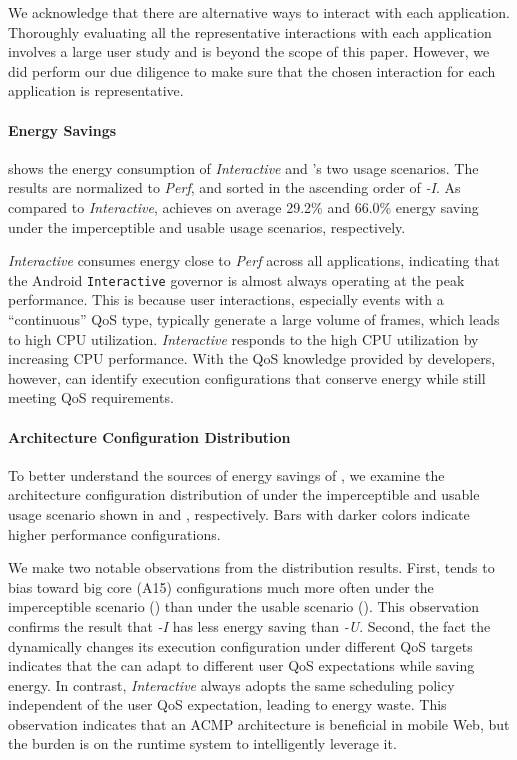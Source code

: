 We acknowledge that there are alternative ways to interact with each application. Thoroughly evaluating all the representative interactions with each application involves a large user study and is beyond the scope of this paper. However, we did perform our due diligence to make sure that the chosen interaction for each application is representative.

\paragraph{Energy Savings}  shows the energy consumption of \textit{Interactive} and \ebs's two usage scenarios. The results are normalized to \textit{Perf}, and sorted in the ascending order of \textit{\ebs-I}. As compared to \textit{Interactive}, \ebs achieves on average 29.2\% and 66.0\% energy saving under the imperceptible and usable usage scenarios, respectively.

\textit{Interactive} consumes energy close to \textit{Perf} across all applications, indicating that the Android \texttt{Interactive} governor is almost always operating at the peak performance. This is because user interactions, especially events with a ``continuous'' QoS type, typically generate a large volume of frames, which leads to high CPU utilization. \textit{Interactive} responds to the high CPU utilization by increasing CPU performance. With the QoS knowledge provided by developers, however, \ebs can identify execution configurations that conserve energy while still meeting QoS requirements.

\paragraph{Architecture Configuration Distribution} To better understand the sources of energy savings of \ebs , we examine the architecture configuration distribution of \ebs under the imperceptible and usable usage scenario shown in  and , respectively. Bars with darker colors indicate higher performance configurations.

We make two notable observations from the distribution results. First, \ebs tends to bias toward big core (A15) configurations much more often under the imperceptible scenario () than under the usable scenario (). This observation confirms the result that \textit{\ebs-I} has less energy saving than \textit{\ebs-U}. Second, the fact the \ebs dynamically changes its execution configuration under different QoS targets indicates that the \ebs can adapt to different user QoS expectations while saving energy. In contrast, \textit{Interactive} always adopts the same scheduling policy independent of the user QoS expectation, leading to energy waste. This observation indicates that an ACMP architecture is beneficial in mobile Web, but the burden is on the runtime system to intelligently leverage it.

